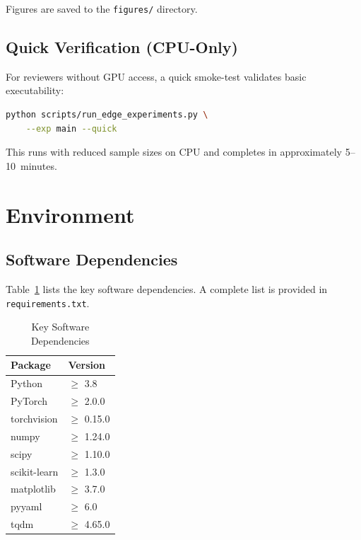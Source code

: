 \documentclass[conference]{IEEEtran}
\begin{document}
Figures are saved to the \texttt{figures/} directory.

\subsection{Quick Verification (CPU-Only)}

For reviewers without GPU access, a quick smoke-test validates basic executability:

\begin{lstlisting}[language=bash]
python scripts/run_edge_experiments.py \
    --exp main --quick
\end{lstlisting}

This runs with reduced sample sizes on CPU and completes in approximately 5--10~minutes.

\section{Environment}

\subsection{Software Dependencies}

Table~\ref{tab:deps} lists the key software dependencies.
A complete list is provided in \texttt{requirements.txt}.

\begin{table}[h]
\centering
\caption{Key Software Dependencies}
\label{tab:deps}
\begin{tabular}{@{}ll@{}}
\toprule
Package & Version \\
\midrule
Python       & $\geq$ 3.8   \\
PyTorch      & $\geq$ 2.0.0 \\
torchvision  & $\geq$ 0.15.0 \\
numpy        & $\geq$ 1.24.0 \\
scipy        & $\geq$ 1.10.0 \\
scikit-learn & $\geq$ 1.3.0 \\
matplotlib   & $\geq$ 3.7.0 \\
pyyaml       & $\geq$ 6.0   \\
tqdm         & $\geq$ 4.65.0 \\
\bottomrule
\end{tabular}
\end{table}
\end{document}

